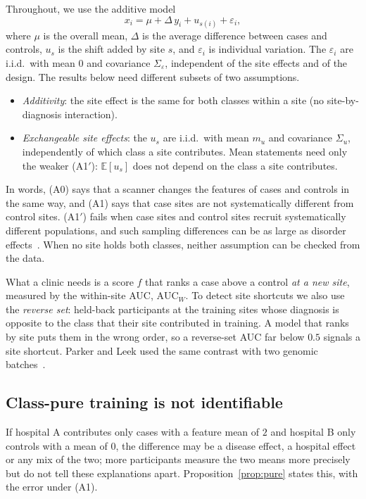 Throughout, we use the additive model
\begin{equation}
x_i=\mu+\Delta\,y_i+u_{s(i)}+\varepsilon_i ,\label{eq:model}
\end{equation}
where $\mu$ is the overall mean, $\Delta$ is the average difference between cases and controls, $u_s$ is the shift added by site $s$, and $\varepsilon_i$ is individual variation. The $\varepsilon_i$ are i.i.d.\ with mean $0$ and covariance $\Sigma_\varepsilon$, independent of the site effects and of the design. The results below need different subsets of two assumptions.
\begin{itemize}
\item[(A0)] \emph{Additivity}: the site effect is the same for both classes within a site (no site-by-diagnosis interaction).
\item[(A1)] \emph{Exchangeable site effects}: the $u_s$ are i.i.d.\ with mean $m_u$ and covariance $\Sigma_u$, independently of which class a site contributes. Mean statements need only the weaker (A1$'$): $\mathbb{E}[u_s]$ does not depend on the class a site contributes.
\end{itemize}
In words, (A0) says that a scanner changes the features of cases and controls in the same way, and (A1) says that case sites are not systematically different from control sites. (A1$'$) fails when case sites and control sites recruit systematically different populations, and such sampling differences can be as large as disorder effects~\cite{yamashita2019}. When no site holds both classes, neither assumption can be checked from the data.

What a clinic needs is a score $f$ that ranks a case above a control \emph{at a new site}, measured by the within-site AUC, $\mathrm{AUC}_W$. To detect site shortcuts we also use the \emph{reverse set}: held-back participants at the training sites whose diagnosis is opposite to the class that their site contributed in training. A model that ranks by site puts them in the wrong order, so a reverse-set AUC far below $0.5$ signals a site shortcut. Parker and Leek used the same contrast with two genomic batches~\cite{parker2012}.

\subsection{Class-pure training is not identifiable}\label{sec:prop1}

If hospital A contributes only cases with a feature mean of $2$ and hospital B only controls with a mean of $0$, the difference may be a disease effect, a hospital effect or any mix of the two; more participants measure the two means more precisely but do not tell these explanations apart. Proposition~\ref{prop:pure} states this, with the error under (A1).

